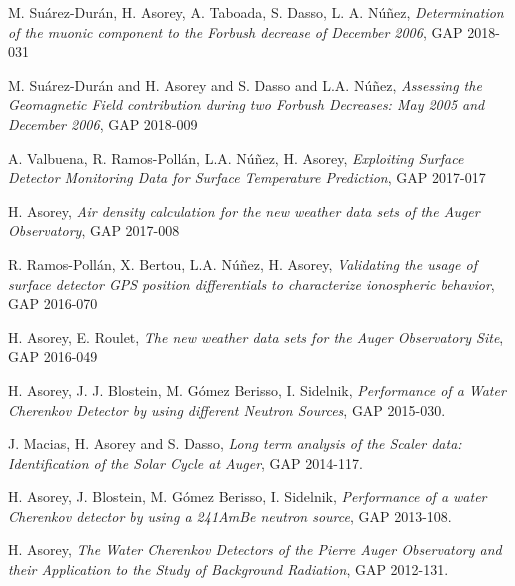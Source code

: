 \noindent
\begin{etaremune}

\item {} M. Suárez-Durán, H. Asorey, A. Taboada, S. Dasso, L. A. Núñez, {\emph{Determination of the muonic component to the Forbush decrease of December 2006}}, GAP 2018-031

\item {} M. Suárez-Durán and H. Asorey and S. Dasso and L.A. Núñez, {\emph{Assessing the Geomagnetic Field contribution during two Forbush Decreases: May 2005 and December 2006}}, GAP 2018-009

\item {} A. Valbuena, R. Ramos-Pollán, L.A. Núñez, H. Asorey, {\emph{Exploiting Surface Detector Monitoring Data for Surface Temperature Prediction}}, GAP 2017-017

\item {} H. Asorey, {\emph{Air density calculation for the new weather data sets of the Auger Observatory}}, GAP 2017-008

\item {} R. Ramos-Pollán, X. Bertou, L.A. Núñez, H. Asorey, {\emph{Validating the usage of surface detector GPS position differentials to characterize ionospheric behavior}}, GAP 2016-070

\item {} H. Asorey, E. Roulet, {\emph{The new weather data sets for the Auger Observatory Site}}, GAP 2016-049

\item {} H. Asorey, J. J. Blostein, M. Gómez Berisso, I. Sidelnik, {\emph{Performance of a Water Cherenkov Detector by using different Neutron Sources}}, GAP 2015-030.

\item {} J. Macias, H. Asorey and S. Dasso, {\emph{Long term analysis of the Scaler data: Identification of the Solar Cycle at Auger}}, GAP 2014-117.

\item {} H. Asorey, J. Blostein, M. Gómez Berisso, I. Sidelnik, {\emph{Performance of a water Cherenkov detector by using a 241AmBe neutron source}}, GAP 2013-108.

\item {} H. Asorey, {\emph{The Water Cherenkov Detectors of the Pierre Auger Observatory and their Application to the Study of Background Radiation}}, GAP 2012-131.


\end{etaremune}
